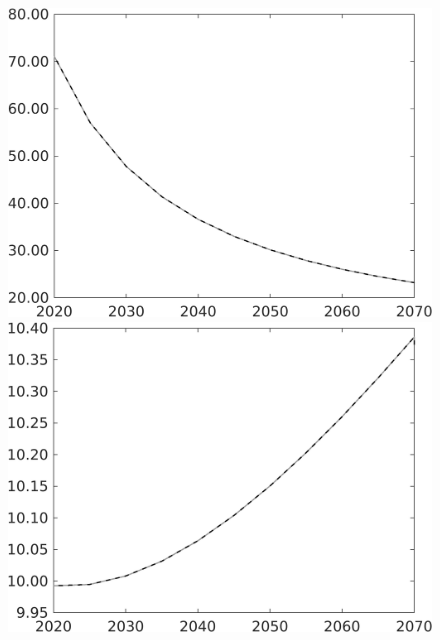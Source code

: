 \documentclass[12pt]{article}
\begin{document}
\begin{figure}[h!!]
\begin{minipage}[]{0.32\textwidth}
	\end{minipage}	
	\begin{minipage}[]{0.32\textwidth}
		\includegraphics[width=1\textwidth]{../../codding_model/own_basedOnFried/optimalPol_010922_revision/figures/all_13Sept22/CompTaul_Equlab_LFBAU_Reg0_gAg_spillover0_nsk1_xgr1_knspil0_sep1_countec0_GovRev0_etaa0.79_lgd0.png}
	\end{minipage}	
	\begin{minipage}[]{0.32\textwidth}
		\includegraphics[width=1\textwidth]{../../codding_model/own_basedOnFried/optimalPol_010922_revision/figures/all_13Sept22/CompTaul_Equlab_LFBAU_Reg0_gAf_spillover0_nsk1_xgr1_knspil0_sep1_countec0_GovRev0_etaa0.79_lgd0.png}

\end{minipage}
\end{figure}
\end{document}
